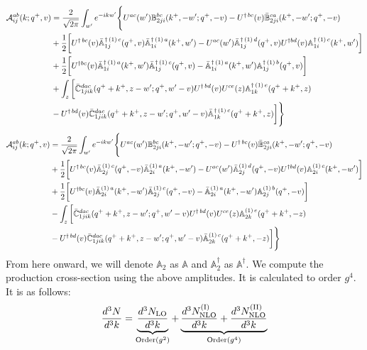 \documentclass[aps,prd,amsmath,amssymb,nofootinbib]{revtex4-2}
\def\mf#1{\mathbb{#1}}
\numberwithin{equation}{section}
\begin{document}
\begin{align}
     {\cal A}^{ab}_{ij}(k; q^+, v) & = \frac{2}{\sqrt{2\pi}} \int_{w^{\prime}}e^{-i k w^\prime}\Bigg\{U^{ac}(w^{\prime}) \mf{B}^{bc}_{2ji}(k^{+},-w^{\prime};q^{+},-v)-U^{\dagger\,bc}(v)\Bar{\mf{B}}^{ca}_{2ji}(k^{+},-w^{\prime}; q^{+},-v)\notag \\ & +\frac{1}{2}\bigg[U^{\dagger\, bc}(v)\Bar{\mf{A}}^{\dagger\,(1)\, c}_{1j}(q^{+},v)\Bar{\mf{A}}^{\dagger\,(1)\, a}_{1i}(k^{+},w^{\prime})-U^{ac}(w^{\prime}) \Bar{\mf{A}}^{\dagger\,(1)\, d}_{1j}(q^{+},v)U^{\dagger bd}(v) \mf{A}^{\dagger\,(1)\, c}_{1i}(k^{+},w^{\prime})\bigg]\notag \\ & +\frac{1}{2}\bigg[U^{\dagger bc}(v)\Bar{\mf{A}}^{\dagger\, (1)\, a}_{1i}(k^{+},w^{\prime})\Bar{\mf{A}}^{\dagger \, (1)\, c}_{1j}(q^{+},v)-\Bar{\mf{A}}^{\dagger\,(1)\, a}_{1i}(k^{+},w^{\prime}) \mf{A}^{\dagger\,(1)\, b}_{1j}(q^{+},v)\bigg]\notag \\ & +\int_{z}\bigg[\Bar{\mf{C}}^{dac}_{1jik}(q^{+}+k^{+},z-w^{\prime}; q^{+},w^{\prime}-v)U^{\dagger\, bd}(v)U^{ce}(z) \mf{A}^{\dagger\,(1)\,e}_{1k}(q^{+}+k^{+},z)\notag \\ &-U^{\dagger\, bd}(v) \Bar{\mf{C}}^{dac}_{1jik}(q^{+}+k^{+},z-w^{\prime}; q^{+},w^{\prime}-v)\Bar{\mf{A}}^{\dagger\,(1)\,c}_{1k}(q^{+}+k^{+},z)\bigg]\Bigg\}
\end{align}
\begin{align}
     {\cal A}^{ab}_{ij}(k; q^+, v) & = \frac{2}{\sqrt{2\pi}} \int_{w^{\prime}}e^{-i k w^\prime}\Bigg\{U^{ac}(w^{\prime}) \mf{B}^{bc}_{2ji}(k^{+},-w^{\prime};q^{+},-v)-U^{\dagger\, bc}(v)\Bar{\mf{B}}^{ca}_{2ji}(k^{+},-w^{\prime}; q^{+},-v)\notag \\ & +\frac{1}{2}\bigg[U^{\dagger\, bc}(v)\Bar{\mf{A}}^{(1)\, c}_{2j}(q^{+},-v)\Bar{\mf{A}}^{(1)\, a}_{2i}(k^{+},-w^{\prime})-U^{ac}(w^{\prime}) \Bar{\mf{A}}^{(1)\, d}_{2j}(q^{+},-v)U^{\dagger bd}(v) \mf{A}^{(1)\, c}_{2i}(k^{+},- w^{\prime})\bigg]\notag \\ & +\frac{1}{2}\bigg[U^{\dagger bc}(v)\Bar{\mf{A}}^{(1)\, a}_{2i}(k^{+},- w^{\prime})\Bar{\mf{A}}^{(1)\, c}_{2j}(q^{+},-v)-\Bar{\mf{A}}^{(1)\, a}_{2i}(k^{+},- w^{\prime}) \mf{A}^{(1)\, b}_{2j}(q^{+},- v)\bigg]\notag \\ & -\int_{z}\bigg[\Bar{\mf{C}}^{dac}_{1jik}(q^{+}+k^{+},z-w^{\prime}; q^{+},w^{\prime}-v)U^{\dagger\, bd}(v)U^{ce}(z) \mf{A}^{(1)\,e}_{2k}(q^{+}+k^{+},-z)\notag \\ &-U^{\dagger\, bd}(v) \Bar{\mf{C}}^{dac}_{1jik}(q^{+}+k^{+},z-w^{\prime}; q^{+},w^{\prime}-v)\Bar{\mf{A}}^{(1)\,c}_{2k}(q^{+}+k^{+},-z)\bigg]\Bigg\}
\end{align}
From here onward, we will denote $\mf{A}_{2}$ as $\mf{A}$ and $\mf{A}^{\dagger}_{2}$ as $\mf{A}^{\dagger}$. We compute the production cross-section using the above amplitudes. It is calculated to order $g^{4}$. It is as follows:
\begin{align}
    \frac{d^{3}N}{d^{3}k} = 
     \underbrace{\frac{d^{3}N_{\rm LO}}{d^{3}k}}_{\text{Order}(g^{2})}
     + 
    \underbrace{ \frac{d^{3}N_{\rm NLO}^{\rm (I)}}{d^{3}k}
     + \frac{d^{3}N_{\rm NLO}^{\rm (II)}}{d^{3}k}}_{\text{Order}(g^{4})}
\end{align}
\end{document}
